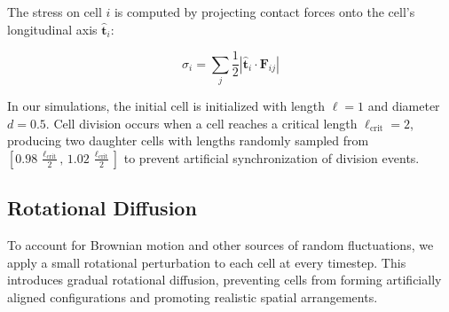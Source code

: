 \documentclass[conference]{IEEEtran}
\begin{document}
The stress on cell $i$ is computed by projecting contact forces onto the cell's longitudinal axis $\hat{\mathbf{t}}_i$:

\begin{equation} \label{eq:stress}
    \sigma_i = \sum_{j} \frac{1}{2} \left| \hat{\mathbf{t}}_i \cdot \mathbf{F}_{ij} \right|
\end{equation}

In our simulations, the initial cell is initialized with length $\ell = 1$ and diameter $d = 0.5$. Cell division occurs when a cell reaches a critical length $\ell_{\text{crit}} = 2$, producing two daughter cells with lengths randomly sampled from $\left[0.98\,\frac{\ell_{\text{crit}}}{2},\, 1.02\,\frac{\ell_{\text{crit}}}{2}\right]$ to prevent artificial synchronization of division events.



\subsection{Rotational Diffusion}

To account for Brownian motion and other sources of random fluctuations, we apply a small rotational perturbation to each cell at every timestep. This introduces gradual rotational diffusion, preventing cells from forming artificially aligned configurations and promoting realistic spatial arrangements.
\end{document}
